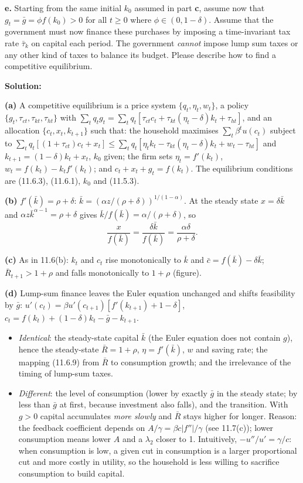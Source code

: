 \documentclass[12pt, letterpaper]{article}
\newcommand{\Rb}{\bar R}
\newcommand{\kb}{\bar k}
\newcommand{\cb}{\bar c}
\newcommand{\gb}{\bar g}
\begin{document}
\begin{tcolorbox}[evenbox,title={Exercise 11.14 \quad Transitions with and without government purchases}]
\begin{tcolorbox}[questionbox]
\textbf{e.} Starting from the same initial $k_0$ assumed in part \textbf{c}, assume now that $g_t=\bar g=\phi f(k_0)>0$
for all $t\ge0$ where $\phi\in(0,1-\delta)$. Assume that the government must now finance these purchases by imposing a
time-invariant tax rate $\bar\tau_k$ on capital each period. The government \emph{cannot} impose lump sum taxes or any
other kind of taxes to balance its budget. Please describe how to find a competitive equilibrium.
\end{tcolorbox}

\textbf{Solution:}

\textbf{(a)} A competitive equilibrium is a price system $\{q_t,\eta_t,w_t\}$, a policy
$\{g_t,\tau_{ct},\tau_{kt},\tau_{ht}\}$ with
$\sum_tq_tg_t=\sum_tq_t[\tau_{ct}c_t+\tau_{kt}(\eta_t-\delta)k_t+\tau_{ht}]$, and an allocation $\{c_t,x_t,k_{t+1}\}$ such
that: the household maximises $\sum_t\beta^tu(c_t)$ subject to
$\sum_tq_t[(1+\tau_{ct})c_t+x_t]\le\sum_tq_t[\eta_tk_t-\tau_{kt}(\eta_t-\delta)k_t+w_t-\tau_{ht}]$ and
$k_{t+1}=(1-\delta)k_t+x_t$, $k_0$ given; the firm sets $\eta_t=f'(k_t)$, $w_t=f(k_t)-k_tf'(k_t)$; and
$c_t+x_t+g_t=f(k_t)$. The equilibrium conditions are (11.6.3), (11.6.1), $k_0$ and (11.5.3).

\textbf{(b)} $f'(\kb)=\rho+\delta$: $\kb=(\alpha z/(\rho+\delta))^{1/(1-\alpha)}$. At the steady state $x=\delta\kb$ and
$\alpha z\kb^{\alpha-1}=\rho+\delta$ gives $\kb/f(\kb)=\alpha/(\rho+\delta)$, so
\[
\frac{x}{f(\kb)}=\frac{\delta\kb}{f(\kb)}=\frac{\alpha\delta}{\rho+\delta}.
\]

\textbf{(c)} As in 11.6(b): $k_t$ and $c_t$ rise monotonically to $\kb$ and $\cb=f(\kb)-\delta\kb$; $\Rb_{t+1}>1+\rho$ and
falls monotonically to $1+\rho$ (figure).

\textbf{(d)} Lump-sum finance leaves the Euler equation unchanged and shifts feasibility by $\gb$:
$u'(c_t)=\beta u'(c_{t+1})[f'(k_{t+1})+1-\delta]$, $c_t=f(k_t)+(1-\delta)k_t-\gb-k_{t+1}$.
\begin{itemize}[itemsep=2pt]
\item \emph{Identical}: the steady-state capital $\kb$ (the Euler equation does not contain $g$), hence the steady-state
$\Rb=1+\rho$, $\eta=f'(\kb)$, $w$ and saving rate; the mapping (11.6.9) from $\Rb$ to consumption growth; and
the irrelevance of the timing of lump-sum taxes.
\item \emph{Different}: the level of consumption (lower by exactly $\gb$ in the steady state; by less than $\gb$ at first,
because investment also falls), and the transition. With $g>0$ capital accumulates \emph{more slowly} and $\Rb$ stays
higher for longer. Reason: the feedback coefficient depends on $A/\gamma=\beta c|f''|/\gamma$ (see 11.7(c)); lower
consumption means lower $A$ and a $\lambda_2$ closer to 1. Intuitively, $-u''/u'=\gamma/c$: when consumption is low, a
given cut in consumption is a larger proportional cut and more costly in utility, so the household is less willing to
sacrifice consumption to build capital.
\end{itemize}


\end{tcolorbox}
\end{document}
